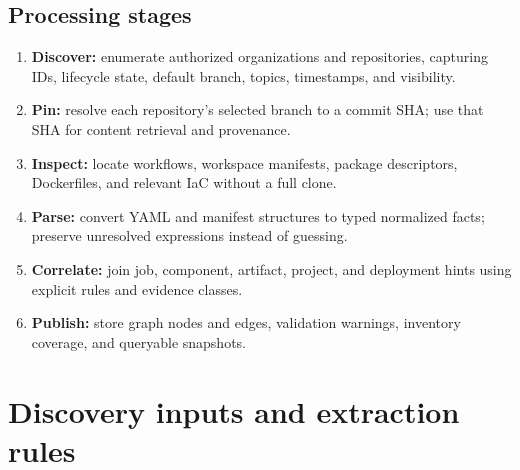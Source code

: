 \documentclass[11pt,letterpaper]{article}
\newcommand{\term}[1]{\textbf{\color{Navy}#1}}
\begin{document}
\subsection{Processing stages}
\begin{enumerate}
\item \term{Discover:} enumerate authorized organizations and repositories, capturing IDs, lifecycle state, default branch, topics, timestamps, and visibility.
\item \term{Pin:} resolve each repository's selected branch to a commit SHA; use that SHA for content retrieval and provenance.
\item \term{Inspect:} locate workflows, workspace manifests, package descriptors, Dockerfiles, and relevant IaC without a full clone.
\item \term{Parse:} convert YAML and manifest structures to typed normalized facts; preserve unresolved expressions instead of guessing.
\item \term{Correlate:} join job, component, artifact, project, and deployment hints using explicit rules and evidence classes.
\item \term{Publish:} store graph nodes and edges, validation warnings, inventory coverage, and queryable snapshots.
\end{enumerate}

\section{Discovery inputs and extraction rules}
\end{document}
